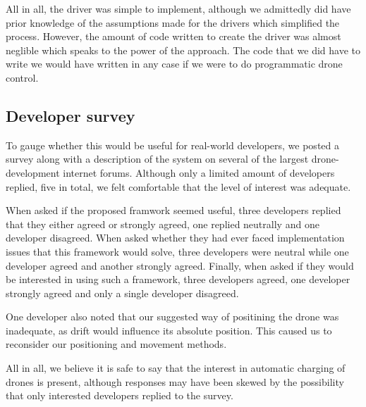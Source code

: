 All in all, the driver was simple to implement, although we admittedly did have prior knowledge of the assumptions made for the drivers which simplified the process. However, the amount of code written to create the driver was almost neglible which speaks to the power of the approach. The code that we did have to write we would have written in any case if we were to do programmatic drone control.

\subsection{Developer survey}
To gauge whether this would be useful for real-world developers, we posted a survey along with a description of the system on several of the largest drone-development internet forums. Although only a limited amount of developers replied, five in total, we felt comfortable that the level of interest was adequate. 

When asked if the proposed framwork seemed useful, three developers replied that they either agreed or strongly agreed, one replied neutrally and one developer disagreed. When asked whether they had ever faced implementation issues that this framework would solve, three developers were neutral while one developer agreed and another strongly agreed. Finally, when asked if they would be interested in using such a framework, three developers agreed, one developer strongly agreed and only a single developer disagreed.

One developer also noted that our suggested way of positining the drone was inadequate, as drift would influence its absolute position. This caused us to reconsider our positioning and movement methods.

All in all, we believe it is safe to say that the interest in automatic charging of drones is present, although  responses may have been skewed by the possibility that only interested developers replied to the survey.

